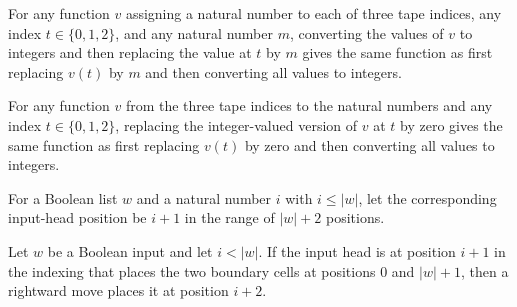 \begin{theorem}
\label{BoolCircuit.CktSatReduction.Emitter.headsOf_update}
\leanok
{}
For any function $v$ assigning a natural number to each of three tape indices, any index
$t\in\{0,1,2\}$, and any natural number $m$, converting the values of $v$ to integers
and then replacing the value at $t$ by $m$ gives the same function as first replacing
$v(t)$ by $m$ and then converting all values to integers.
\end{theorem}

\begin{theorem}
\label{BoolCircuit.CktSatReduction.Emitter.headsOf_update_zero}
\leanok
{}
For any function $v$ from the three tape indices to the natural numbers and any index
$t\in\{0,1,2\}$, replacing the integer-valued version of $v$ at $t$ by zero gives the
same function as first replacing $v(t)$ by zero and then converting all values to
integers.
\end{theorem}

\begin{definition}
\label{BoolCircuit.CktSatReduction.Emitter.ip}
\leanok
For a Boolean list $w$ and a natural number $i$ with $i\leq |w|$, let the corresponding
input-head position be $i+1$ in the range of $|w|+2$ positions.
\end{definition}

\begin{theorem}
\label{BoolCircuit.CktSatReduction.Emitter.move_ip}
\leanok
{}
Let $w$ be a Boolean input and let $i<|w|$. If the input head is at position $i+1$ in
the indexing that places the two boundary cells at positions $0$ and $|w|+1$, then a
rightward move places it at position $i+2$.
\end{theorem}

